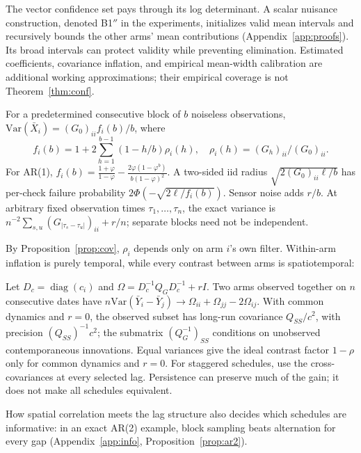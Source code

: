 \documentclass[sigconf,review,anonymous]{acmart}
\newcommand{\Var}{\mathrm{Var}}
\newcommand{\diag}{\operatorname{diag}}
\begin{document}
The vector confidence set pays through its log determinant. A scalar nuisance construction, denoted B1$''$ in the experiments, initializes valid mean intervals and recursively bounds the other arms' mean contributions (Appendix~\ref{app:proofs}). Its broad intervals can protect validity while preventing elimination. Estimated coefficients, covariance inflation, and empirical mean-width calibration are additional working approximations; their empirical coverage is not Theorem~\ref{thm:conf}.

\begin{proposition}\label{prop:b2}
For a predetermined consecutive block of $b$ noiseless observations, $\Var(\bar X_i)=(G_0)_{ii}f_i(b)/b$, where
\[
f_i(b)=1+2\sum_{h=1}^{b-1}(1-h/b)\rho_i(h),\quad
\rho_i(h)=(G_h)_{ii}/(G_0)_{ii}.
\]
For AR(1), $f_i(b)=\frac{1+\varphi}{1-\varphi}-\frac{2\varphi(1-\varphi^b)}{b(1-\varphi)^2}$. A two-sided iid radius $\sqrt{2(G_0)_{ii}\ell/b}$ has per-check failure probability $2\Phi(-\sqrt{2\ell/f_i(b)})$. Sensor noise adds $r/b$. At arbitrary fixed observation times $\tau_1,\ldots,\tau_n$, the exact variance is $n^{-2}\sum_{s,u}(G_{|\tau_s-\tau_u|})_{ii}+r/n$; separate blocks need not be independent.
\end{proposition}

By Proposition~\ref{prop:cov}, $\rho_i$ depends only on arm $i$'s own filter. Within-arm inflation is purely temporal, while every contrast between arms is spatiotemporal:

\begin{proposition}[Contrasts, B3(2)]\label{prop:contrast}
Let $D_c=\diag(c_i)$ and $\Omega=D_c^{-1}Q_GD_c^{-1}+rI$. Two arms observed together on $n$ consecutive dates have $n\Var(\bar Y_i-\bar Y_j)\to\Omega_{ii}+\Omega_{jj}-2\Omega_{ij}$. With common dynamics and $r=0$, the observed subset has long-run covariance $Q_{SS}/c^2$, with precision $(Q_{SS})^{-1}c^2$; the submatrix $(Q_G^{-1})_{SS}$ conditions on unobserved contemporaneous innovations. Equal variances give the ideal contrast factor $1-\rho$ only for common dynamics and $r=0$. For staggered schedules, use the cross-covariances at every selected lag. Persistence can preserve much of the gain; it does not make all schedules equivalent.
\end{proposition}

How spatial correlation meets the lag structure also decides which schedules are informative: in an exact AR(2) example, block sampling beats alternation for every gap (Appendix~\ref{app:info}, Proposition~\ref{prop:ar2}).
\end{document}
